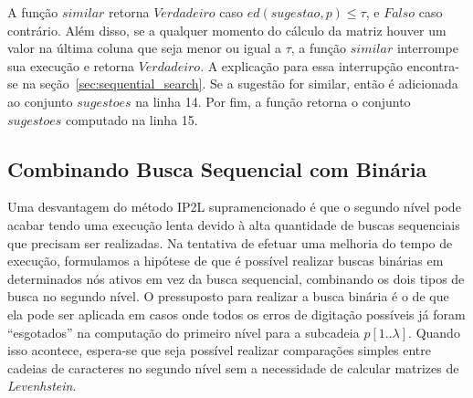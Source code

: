A função $similar$ retorna $Verdadeiro$ caso $ed(sugestao, p) \leq \tau$, e $Falso$ caso contrário. Além disso, se a qualquer momento do cálculo da matriz houver um valor na última coluna que seja menor ou igual a $\tau$, a função $similar$ interrompe sua execução e retorna $Verdadeiro$. A explicação para essa interrupção encontra-se na seção~\ref{sec:sequential_search}. Se a sugestão for similar, então é adicionada ao conjunto $sugestoes$ na linha 14. Por fim, a função retorna o conjunto $sugestoes$ computado na linha 15.



\subsection{Combinando Busca Sequencial com Binária}
\label{sec:IP2LB}

Uma desvantagem do método IP2L supramencionado é que o segundo nível pode acabar tendo uma execução lenta devido à alta quantidade de buscas sequenciais que precisam ser realizadas. Na tentativa de efetuar uma melhoria do tempo de execução, formulamos a hipótese de que é possível realizar buscas binárias em determinados nós ativos em vez da busca sequencial, combinando os dois tipos de busca no segundo nível. O pressuposto para realizar a busca binária é o de que ela pode ser aplicada em casos onde todos os erros de digitação possíveis já foram ``esgotados'' na computação do primeiro nível para a subcadeia $p[1..\lambda]$. Quando isso acontece, espera-se que seja possível realizar comparações simples entre cadeias de caracteres no segundo nível sem a necessidade de calcular matrizes de \textit{Levenhstein}.

